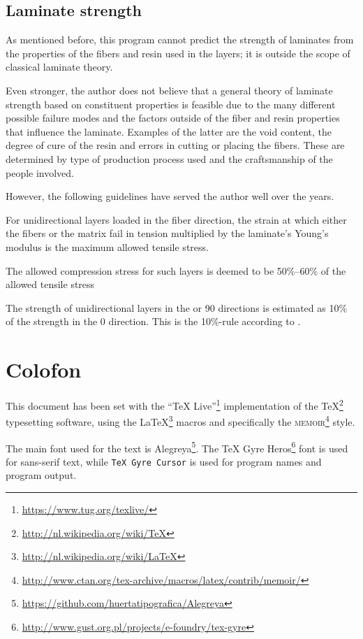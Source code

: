 \documentclass[a4paper,landscape,oneside,11pt,twocolumn]{memoir}
\begin{document}
\section{Laminate strength}

As mentioned before, this program cannot predict the strength of laminates
from the properties of the fibers and resin used in the layers; it is outside
the scope of classical laminate theory.

Even stronger, the author does not believe that a general theory of laminate
strength based on constituent properties is feasible due to the many different
possible failure modes and the factors outside of the fiber and resin
properties that influence the laminate.  Examples of the latter are the void
content, the degree of cure of the resin and errors in cutting or placing the
fibers. These are determined by type of production process used and the
craftsmanship of the people involved.

However, the following guidelines have served the author well over the years.

For unidirectional layers loaded in the fiber direction, the strain at which
either the fibers or the matrix fail in tension multiplied by the laminate's
Young's modulus is the maximum allowed tensile stress.

The allowed compression stress for such layers is deemed to be 50\%--60\% of the
allowed tensile stress

The strength of unidirectional layers in the \textdegree{} or
90\textdegree{} directions is estimated as 10\% of the strength in the
0\textdegree{} direction. This is the 10\%-rule according to
\citet{1992WeiEn..52...29H}.

%

\chapter{Colofon}

This document has been set with the “TeX
Live”\footnote{\url{https://www.tug.org/texlive/}} implementation of the
\TeX\footnote{\url{http://nl.wikipedia.org/wiki/TeX}} typesetting software,
using the \LaTeX\footnote{\url{http://nl.wikipedia.org/wiki/LaTeX}} macros and
specifically the \textsc{memoir}\footnote{%
    \url{http://www.ctan.org/tex-archive/macros/latex/contrib/memoir/}} style.

The main font used for the text is
Alegreya\footnote{\url{https://github.com/huertatipografica/Alegreya}}.  The
\textsf{TeX Gyre
Heros}\footnote{\url{http://www.gust.org.pl/projects/e-foundry/tex-gyre}} font
is used for sans-serif text, while \texttt{TeX Gyre Cursor} is used for
program names and program output.
\end{document}
